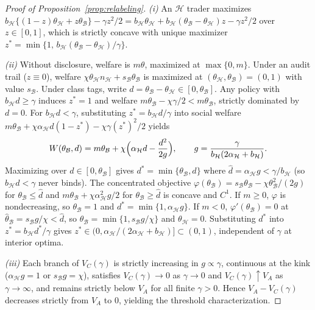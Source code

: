 \documentclass[11pt,letterpaper]{article}
\theoremstyle{definition}
\begin{document}
\begin{proof}[Proof of Proposition~\ref{prop:relabeling}]
\emph{(i)} An $\mathcal{H}$ trader maximizes $b_{\mathcal{H}}\{(1 - z)\theta_{\mathcal{H}} + z \theta_{\mathcal{B}}\} - \gamma z^2/2 = b_{\mathcal{H}}\theta_{\mathcal{H}} + b_{\mathcal{H}}(\theta_{\mathcal{B}} - \theta_{\mathcal{H}})z - \gamma z^2/2$ over $z \in [0, 1]$, which is strictly concave with unique maximizer $z^* = \min\{1,\, b_{\mathcal{H}}(\theta_{\mathcal{B}} - \theta_{\mathcal{H}})/\gamma\}$.

\emph{(ii)} Without disclosure, welfare is $m\theta$, maximized at $\max\{0, m\}$. Under an audit trail ($z \equiv 0$), welfare $\chi \theta_{\mathcal{H}} n_{\mathcal{H}} + s_{\mathcal{B}} \theta_{\mathcal{B}}$ is maximized at $(\theta_{\mathcal{H}}, \theta_{\mathcal{B}}) = (0, 1)$ with value $s_{\mathcal{B}}$. Under class tags, write $d = \theta_{\mathcal{B}} - \theta_{\mathcal{H}} \in [0, \theta_{\mathcal{B}}]$. Any policy with $b_{\mathcal{H}} d \ge \gamma$ induces $z^* = 1$ and welfare $m\theta_{\mathcal{B}} - \chi\gamma/2 < m\theta_{\mathcal{B}}$, strictly dominated by $d = 0$. For $b_{\mathcal{H}} d < \gamma$, substituting $z^* = b_{\mathcal{H}} d / \gamma$ into social welfare $m\theta_{\mathcal{B}} + \chi \alpha_{\mathcal{H}} d (1 - z^*) - \chi \gamma (z^*)^2 / 2$ yields
\[
  W(\theta_{\mathcal{B}}, d) = m\theta_{\mathcal{B}} + \chi \Bigl(\alpha_{\mathcal{H}} d - \frac{d^2}{2g}\Bigr),
  \qquad g = \frac{\gamma}{b_{\mathcal{H}}(2\alpha_{\mathcal{H}} + b_{\mathcal{H}})}.
\]
Maximizing over $d \in [0, \theta_{\mathcal{B}}]$ gives $d^* = \min\{\theta_{\mathcal{B}}, \hat{d}\}$ where $\hat{d} = \alpha_{\mathcal{H}} g < \gamma / b_{\mathcal{H}}$ (so $b_{\mathcal{H}} d < \gamma$ never binds). The concentrated objective $\varphi(\theta_{\mathcal{B}}) = s_{\mathcal{B}}\theta_{\mathcal{B}} - \chi \theta_{\mathcal{B}}^2 / (2g)$ for $\theta_{\mathcal{B}} \le \hat{d}$ and $m\theta_{\mathcal{B}} + \chi \alpha_{\mathcal{H}}^2 g / 2$ for $\theta_{\mathcal{B}} \ge \hat{d}$ is concave and $C^1$. If $m \ge 0$, $\varphi$ is nondecreasing, so $\theta_{\mathcal{B}} = 1$ and $d^* = \min\{1, \alpha_{\mathcal{H}} g\}$. If $m < 0$, $\varphi'(\theta_{\mathcal{B}}) = 0$ at $\hat{\theta}_{\mathcal{B}} = s_{\mathcal{B}} g / \chi < \hat{d}$, so $\theta_{\mathcal{B}} = \min\{1, s_{\mathcal{B}} g / \chi\}$ and $\theta_{\mathcal{H}} = 0$. Substituting $d^*$ into $z^* = b_{\mathcal{H}} d^* / \gamma$ gives $z^* \in (0, \alpha_{\mathcal{H}}/(2\alpha_{\mathcal{H}} + b_{\mathcal{H}})] \subset (0, 1)$, independent of $\gamma$ at interior optima.

\emph{(iii)} Each branch of $V_C(\gamma)$ is strictly increasing in $g \propto \gamma$, continuous at the kink ($\alpha_{\mathcal{H}} g = 1$ or $s_{\mathcal{B}} g = \chi$), satisfies $V_C(\gamma) \to 0$ as $\gamma \to 0$ and $V_C(\gamma) \uparrow V_A$ as $\gamma \to \infty$, and remains strictly below $V_A$ for all finite $\gamma > 0$. Hence $V_A - V_C(\gamma)$ decreases strictly from $V_A$ to $0$, yielding the threshold characterization.
\end{proof}
\end{document}

